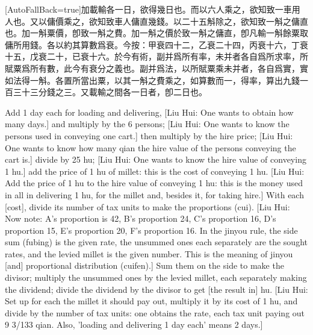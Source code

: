 \documentclass[11pt]{article}
\newcommand{\zhsmall}{\footnotesize\color{black!70}}
\newcommand{\unitlabel}[1]{\marginpar{\raggedleft\tiny\color{gray}#1}}
\newenvironment{unitzh}{\par\CJKfontspec{Noto Serif CJK SC}[AutoFallBack=true]\large\linespread{1.25}\selectfont}{\par}
\newenvironment{uniten}{\par\small\color{black!85}}{\par\medskip}
\begin{document}
\begin{unitzh}\unitlabel{jiuzhang-024.3}加載輸各一日，{\zhsmall 欲得幾日也。}而以六人乘之，{\zhsmall 欲知致一車用人也。}又以傭價乘之，{\zhsmall 欲知致車人傭直幾錢。}以二十五斛除之，{\zhsmall 欲知致一斛之傭直也。}加一斛粟價，卽致一斛之費。{\zhsmall 加一斛之價於致一斛之傭直，卽凡輸一斛餘粟取傭所用錢。}各以約其算數爲衰。{\zhsmall 今按：甲衰四十二，乙衰二十四，丙衰十六，丁衰十五，戊衰二十，已衰十六。於今有術，副并爲所有率，未并者各自爲所求率，所賦粟爲所有數，此今有衰分之義也。}副并爲法，以所賦粟乘未并者，各自爲實，實如法得一斛。{\zhsmall 各置所當出粟，以其一斛之費乘之，如算數而一，得率，算出九錢一百三十三分錢之三。又載輸之間各一日者，卽二日也。}\end{unitzh}
\begin{uniten}Add 1 day each for loading and delivering, [Liu Hui: One wants to obtain how many days.] and multiply by the 6 persons; [Liu Hui: One wants to know the persons used in conveying one cart.] then multiply by the hire price; [Liu Hui: One wants to know how many qian the hire value of the persons conveying the cart is.] divide by 25 hu; [Liu Hui: One wants to know the hire value of conveying 1 hu.] add the price of 1 hu of millet: this is the cost of conveying 1 hu. [Liu Hui: Add the price of 1 hu to the hire value of conveying 1 hu: this is the money used in all in delivering 1 hu, for the millet and, besides it, for taking hire.] With each [cost], divide its number of tax units to make the proportions (cui). [Liu Hui: Now note: A's proportion is 42, B's proportion 24, C's proportion 16, D's proportion 15, E's proportion 20, F's proportion 16. In the jinyou rule, the side sum (fubing) is the given rate, the unsummed ones each separately are the sought rates, and the levied millet is the given number. This is the meaning of jinyou [and] proportional distribution (cuifen).] Sum them on the side to make the divisor; multiply the unsummed ones by the levied millet, each separately making the dividend; divide the dividend by the divisor to get [the result in] hu. [Liu Hui: Set up for each the millet it should pay out, multiply it by its cost of 1 hu, and divide by the number of tax units: one obtains the rate, each tax unit paying out 9 3/133 qian. Also, 'loading and delivering 1 day each' means 2 days.]\end{uniten}
\end{document}
